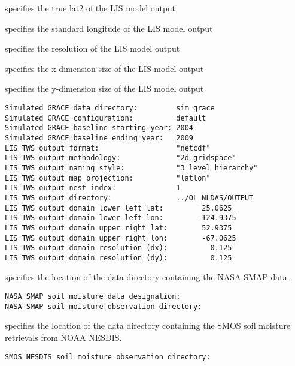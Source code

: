  specifies the true lat2 of the LIS model output

 specifies the standard longitude of the LIS model output

 specifies the resolution of the LIS model output

 specifies the x-dimension size of the LIS model output

 specifies the y-dimension size of the LIS model output

 

 \begin{Verbatim}[frame=single]
Simulated GRACE data directory:         sim_grace
Simulated GRACE configuration:          default
Simulated GRACE baseline starting year: 2004
Simulated GRACE baseline ending year:   2009
LIS TWS output format:                  "netcdf"
LIS TWS output methodology:             "2d gridspace"
LIS TWS output naming style:            "3 level hierarchy"
LIS TWS output map projection:          "latlon"
LIS TWS output nest index:              1
LIS TWS output directory:               ../OL_NLDAS/OUTPUT
LIS TWS output domain lower left lat:         25.0625
LIS TWS output domain lower left lon:        -124.9375
LIS TWS output domain upper right lat:        52.9375
LIS TWS output domain upper right lon:        -67.0625
LIS TWS output domain resolution (dx):          0.125
LIS TWS output domain resolution (dy):          0.125
 \end{Verbatim}

 
  

 specifies the location of the data directory containing the NASA 
 SMAP data.

 

 \begin{Verbatim}[frame=single]
NASA SMAP soil moisture data designation:
NASA SMAP soil moisture observation directory:
 \end{Verbatim}

 
  specifies
 the location of the data directory containing the SMOS soil
 moisture retrievals from NOAA NESDIS.
 

 \begin{Verbatim}[frame=single]
SMOS NESDIS soil moisture observation directory:
 \end{Verbatim}


